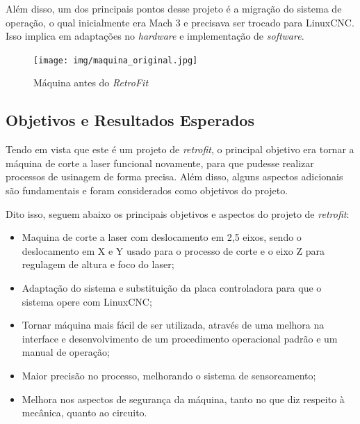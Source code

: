 \documentclass[
	article,			%
	11pt,				%
	oneside,			%
	a4paper,			%
	section=TITLE,		%
	english,			%
	brazil,				%
	sumario=tradicional
	]{abntex2}
\newcommand{\LCNC}{LinuxCNC}
\begin{document}
Além disso, um dos principais pontos desse projeto é a migração do sistema de operação, o qual inicialmente era Mach 3 e precisava ser trocado para \LCNC. Isso implica em adaptações no \textit{hardware} e implementação de \textit{software}.

\begin{figure}[H]
    \centering
    \texttt{[image: img/maquina\_original.jpg]}
    \caption{Máquina antes do \textit{RetroFit}}
    \label{fig:maq-original}
\end{figure}

\subsection{Objetivos e Resultados Esperados}
Tendo em vista que este é um projeto de \textit{retrofit}, o principal objetivo era tornar a máquina de corte a laser funcional novamente, para que pudesse realizar processos de usinagem de forma precisa. Além disso, alguns aspectos adicionais são fundamentais e foram considerados como objetivos do projeto.

Dito isso, seguem abaixo os principais objetivos e aspectos do projeto de \textit{retrofit}:
\begin{itemize}
\item Maquina de corte a laser com deslocamento em 2,5 eixos, sendo o deslocamento em X e Y usado para o processo de corte e o eixo Z para regulagem de altura e foco do laser;
\item Adaptação do sistema e substituição da placa controladora para que o sistema opere com \LCNC;
\item Tornar máquina mais fácil de ser utilizada, através de uma melhora na interface e desenvolvimento de um procedimento operacional padrão e um manual de operação;
\item Maior precisão no processo, melhorando o sistema de sensoreamento;
\item Melhora nos aspectos de segurança da máquina, tanto no que diz respeito à mecânica, quanto ao circuito.
\end{itemize}
\end{document}

